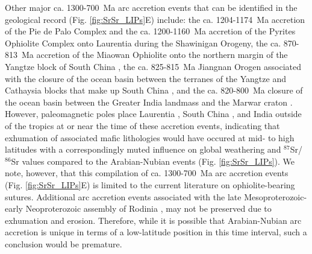 \documentclass[11pt,letterpaper]{article}
\newcommand{\SrSr}{$^{87}$Sr/$^{86}$Sr\xspace}
\begin{document}
Other major ca. 1300-700~Ma arc accretion events that can be identified in the geological record (Fig. \ref{fig:SrSr_LIPs}E) include: the ca. 1204-1174~Ma accretion of the Pie de Palo Complex \citep{Vujovich1998a, Vujovich2004a} and the ca. 1200-1160~Ma accretion of the Pyrites Ophiolite Complex \citep{McLelland2013a} onto Laurentia during the Shawinigan Orogeny, the ca. 870-813~Ma accretion of the Miaowan Ophiolite onto the northern margin of the Yangtze block of South China \citep{Peng2012a}, the ca. 825-815~Ma Jiangnan Orogen associated with the closure of the ocean basin between the terranes of the Yangtze and Cathaysia blocks that make up South China \citep{Zhao2015a}, and the ca. 820-800~Ma closure of the ocean basin between the Greater India landmass and the Marwar craton \citep{Volpe1990a, Chatterjee2017a}. However, paleomagnetic poles place Laurentia \citep{Palmer1977a, Buchan2000a}, South China \citep{Li2004a, Niu2016a}, and India \citep{Meert2013a} outside of the tropics at or near the time of these accretion events, indicating that exhumation of associated mafic lithologies would have occured at mid- to high latitudes with a correspondingly muted influence on global weathering and \SrSr values compared to the Arabian-Nubian events (Fig. \ref{fig:SrSr_LIPs}). We note, however, that this compilation of ca. 1300-700~Ma arc accretion events (Fig. \ref{fig:SrSr_LIPs}E) is limited to the current literature on ophiolite-bearing sutures. Additional arc accretion events associated with the late Mesoproterozoic-early Neoproterozoic assembly of Rodinia \citep{Cawood2016a}, may not be preserved due to exhumation and erosion. Therefore, while it is possible that Arabian-Nubian arc accretion is unique in terms of a low-latitude position in this time interval, such a conclusion would be premature.
\end{document}
